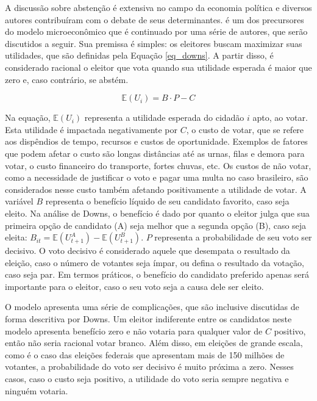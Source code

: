 A discussão sobre abstenção é extensiva no campo da economia política e diversos autores contribuíram com o debate de seus determinantes. \textcite{downs1957economic} é um dos precursores do modelo microeconômico que é continuado por uma série de autores, que serão discutidos a seguir. Sua premissa é simples: os eleitores buscam maximizar suas utilidades, que são definidas pela Equação \ref{eq_downs}. A partir disso, é considerado racional o eleitor que vota quando sua utilidade esperada é maior que zero e, caso contrário, se abstém. 

\begin{equation}
\label{eq_downs}
    \mathbb{E}(U_i)=B\cdot P-C
\end{equation}

Na equação, $\mathbb{E}(U_i)$ representa a utilidade esperada do cidadão $i$ apto, ao votar. Esta utilidade é impactada negativamente por $C$, o custo de votar, que se refere aos dispêndios de tempo, recursos e custos de oportunidade. Exemplos de fatores que podem afetar o custo são longas distâncias até as urnas, filas e demora para votar, o custo financeiro do transporte, fortes chuvas, etc. Os custos de não votar, como a necessidade de justificar o voto e pagar uma multa no caso brasileiro, são considerados nesse custo também afetando positivamente a utilidade de votar. A variável $B$ representa o benefício líquido de seu candidato favorito, caso seja eleito. Na análise de Downs, o benefício é dado por quanto o eleitor julga que sua primeira opção de candidato (A) seja melhor que a segunda opção (B), caso seja eleita: $B_{it} = \mathbb{E}(U^A_{t+1})-\mathbb{E}(U^B_{t+1})$. $P$ representa a probabilidade de seu voto ser decisivo. O voto decisivo é considerado aquele que desempata o resultado da eleição, caso o número de votantes seja ímpar, ou defina o resultado da votação, caso seja par. Em termos práticos, o benefício do candidato preferido apenas será importante para o eleitor, caso o seu voto seja a causa dele ser eleito.

O modelo apresenta uma série de complicações, que são inclusive discutidas de forma descritiva por Downs. Um eleitor indiferente entre os candidatos neste modelo apresenta benefício zero e não votaria para qualquer valor de $C$ positivo, então não seria racional votar branco. Além disso, em eleições de grande escala, como é o caso das eleições federais que apresentam mais de 150 milhões de votantes, a probabilidade do voto ser decisivo é muito próxima a zero. Nesses casos, caso o custo seja positivo, a utilidade do voto seria sempre negativa e ninguém votaria.

